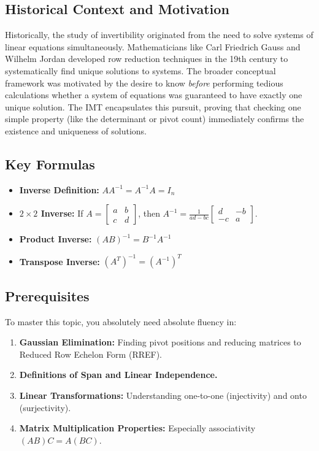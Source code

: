 \documentclass[11pt]{article}
\begin{document}
\subsection*{Historical Context and Motivation}
Historically, the study of invertibility originated from the need to solve systems of linear equations simultaneously. Mathematicians like Carl Friedrich Gauss and Wilhelm Jordan developed row reduction techniques in the 19th century to systematically find unique solutions to systems. The broader conceptual framework was motivated by the desire to know \textit{before} performing tedious calculations whether a system of equations was guaranteed to have exactly one unique solution. The IMT encapsulates this pursuit, proving that checking one simple property (like the determinant or pivot count) immediately confirms the existence and uniqueness of solutions.

\subsection*{Key Formulas}
\begin{itemize}
    \item \textbf{Inverse Definition:} $A A^{-1} = A^{-1} A = I_n$
    \item \textbf{$2 \times 2$ Inverse:} If $A = \begin{bmatrix} a & b \\ c & d \end{bmatrix}$, then $A^{-1} = \frac{1}{ad-bc}\begin{bmatrix} d & -b \\ -c & a \end{bmatrix}$.
    \item \textbf{Product Inverse:} $(AB)^{-1} = B^{-1} A^{-1}$
    \item \textbf{Transpose Inverse:} $(A^T)^{-1} = (A^{-1})^T$
\end{itemize}

\subsection*{Prerequisites}
To master this topic, you absolutely need absolute fluency in:
\begin{enumerate}
    \item \textbf{Gaussian Elimination:} Finding pivot positions and reducing matrices to Reduced Row Echelon Form (RREF).
    \item \textbf{Definitions of Span and Linear Independence.}
    \item \textbf{Linear Transformations:} Understanding one-to-one (injectivity) and onto (surjectivity).
    \item \textbf{Matrix Multiplication Properties:} Especially associativity $(AB)C = A(BC)$.
\end{enumerate}
\end{document}
